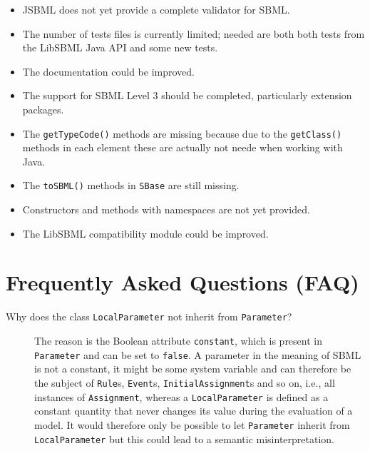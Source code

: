 \documentclass[
  BCOR12mm,
  letterpaper,
  11pt,
  headsepline,
  pointlessnumbers,
  tablecaptionabove,
  onelinecaption,
  headinclude,
  appendixprefix,
  idxtotoc,
  bibtotoc,
  twoside,
  titlepage
]{scrartcl}
\begin{document}
\begin{itemize}
\item JSBML does not yet provide a complete validator for SBML.
\item The number of tests files is currently limited; needed are both both tests
from the LibSBML Java API and some new tests.
\item The documentation could be improved.
\item The support for SBML Level 3 should be completed, particularly extension packages.
\item The \texttt{getTypeCode()} methods are missing because due to the
\texttt{getClass()} methods in each element these are actually not neede when
working with Java.
\item The \texttt{toSBML()} methods in \texttt{SBase} are still missing.
\item Constructors and methods with namespaces are not yet provided.
\item The LibSBML compatibility module could be improved.
\end{itemize}

\appendix

\section{Frequently Asked Questions (FAQ)}

\begin{description}
  \item[Why does the class \texttt{LocalParameter} not inherit from
  \texttt{Parameter}?]
The reason is the Boolean attribute \texttt{constant}, which is present in
\texttt{Parameter} and can be set to \texttt{false}. A parameter in the meaning
of SBML is not a constant, it might be some system variable and can therefore
be the subject of \texttt{Rule}s,
\texttt{Event}s, \texttt{InitialAssignment}s
and so on, i.e., all instances of \texttt{Assignment}, whereas a
\texttt{LocalParameter} is defined as a constant quantity that never changes its
value during the evaluation of a model. It would therefore only be possible to
let \texttt{Parameter} inherit from \texttt{LocalParameter} but this could lead
to a semantic misinterpretation.
\end{description}
\end{document}
